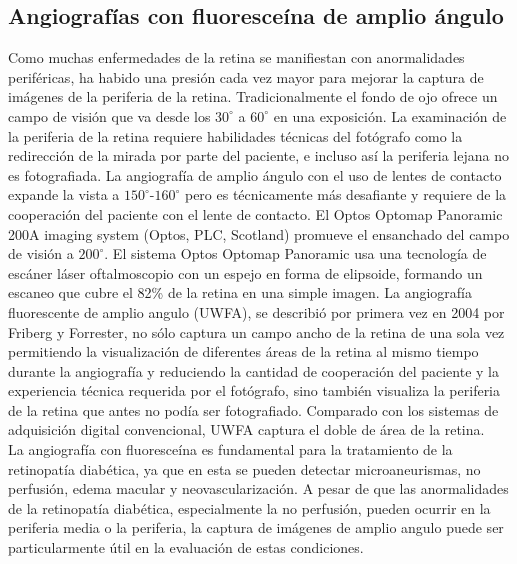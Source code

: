 	\subsection{Angiograf\'ias con fluoresce\'ina de amplio ángulo}

Como muchas enfermedades de la retina se manifiestan con anormalidades periféricas, ha habido una presión cada vez mayor para mejorar la captura de im\'agenes de la periferia de la retina. 
Tradicionalmente el fondo de ojo ofrece un campo de visi\'on que va desde los $30^{\circ}$ a $60^{\circ}$ en una exposición. La examinación de la periferia de la retina requiere habilidades técnicas del fotógrafo como la redirección de la mirada por parte del paciente, e incluso as\'i la periferia lejana no es fotografiada.
La angiografía de amplio ángulo con el uso de lentes de contacto expande la vista a $150^{\circ}$-$160^{\circ}$ pero es técnicamente más desafiante y requiere de la cooperación del paciente con el lente de contacto. 
El Optos Optomap Panoramic 200A imaging system (Optos, PLC, Scotland) promueve el ensanchado del campo de visión a $200^{\circ}$. El sistema  Optos Optomap Panoramic usa una tecnología de escáner láser oftalmoscopio con un espejo en forma de elipsoide, formando un escaneo que cubre el 82\% de la retina en  una simple imagen.
La angiografía  fluorescente de amplio angulo (UWFA), se describió por primera vez en 2004 por Friberg y Forrester, no sólo captura un campo ancho de la retina de una sola vez  permitiendo la visualización de diferentes áreas de la retina  al mismo  tiempo durante la angiografía y reduciendo la cantidad de cooperación del paciente y la experiencia técnica requerida por el fotógrafo, sino también visualiza la periferia de la retina que antes no podía ser fotografiado. Comparado con los sistemas de adquisición digital convencional, UWFA captura el doble de área de la retina.
\\
La angiografía con fluoresceína es fundamental para la tratamiento de la retinopatía diabética, ya que en esta se pueden detectar microaneurismas, no perfusión, edema macular y neovascularización. A pesar de que las anormalidades de la retinopatía diabética, especialmente la no perfusión, pueden ocurrir en la periferia media o la periferia, la captura de imágenes de amplio angulo puede ser particularmente útil en la evaluación de estas condiciones.\cite{patel2014ultra}	


